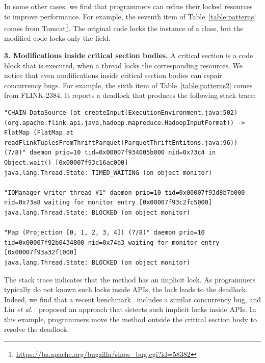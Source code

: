 In some other cases, we find that programmers can refine their locked resources to improve performance. For example, the seventh item of Table~\ref{table:patterns} comes from Tomcat\footnote{\url{https://bz.apache.org/bugzilla/show_bug.cgi?id=58382}}. The original code locks the instance of a class, but the modified code locks only the  field.

\noindent
\textbf{3. Modifications inside critical section bodies.} A critical section is a code block that is executed, when a thread locks the corresponding resources. We notice that even modifications inside critical section bodies can repair concurrency bugs. For example, the sixth item of Table~\ref{table:patterns2} comes from FLINK-2384. It reports a deadlock that produces the following stack trace:

\begin{lstlisting}
"CHAIN DataSource (at createInput(ExecutionEnvironment.java:502) (org.apache.flink.api.java.hadoop.mapreduce.HadoopInputFormat)) -> FlatMap (FlatMap at readFlinkTuplesFromThriftParquet(ParquetThriftEntitons.java:96)) (7/8)" daemon prio=10 tid=0x00007f934005b000 nid=0x73c4 in Object.wait() [0x00007f93c16ac000]
java.lang.Thread.State: TIMED_WAITING (on object monitor)

"IOManager writer thread #1" daemon prio=10 tid=0x00007f93d8b7b000 nid=0x73a8 waiting for monitor entry [0x00007f93c2fc5000]
java.lang.Thread.State: BLOCKED (on object monitor)

"Map (Projection [0, 1, 2, 3, 4]) (7/8)" daemon prio=10 tid=0x00007f92b0434800 nid=0x74a3 waiting for monitor entry [0x00007f93a32f1000]
java.lang.Thread.State: BLOCKED (on object monitor)
\end{lstlisting}

The stack trace indicates that the  method has an implicit lock. As programmers typically do not known such locks inside APIs, the lock leads to the deadlock. Indeed, we find that a recent benchmark~\cite{lin2015ase} includes a similar concurrency bug, and Lin \emph{et al.}~\cite{lin2016lockpeeker} proposed an approach that detects such implicit locks inside APIs. In this example, programmers move the  method outside the critical section body to resolve the deadlock.



